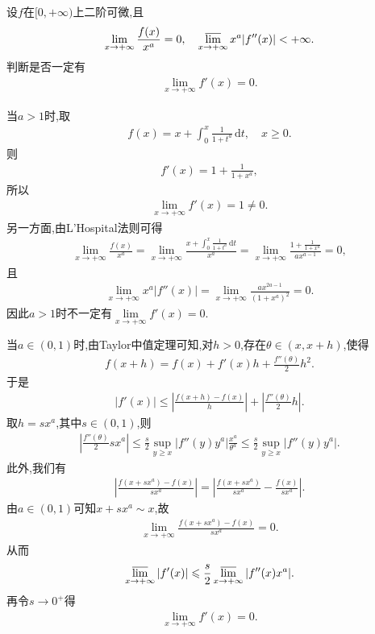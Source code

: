 \documentclass[../../main.tex]{subfiles}%
\begin{document}
\begin{example}
设$f$在$[0,+\infty)$上二阶可微,且
\begin{align*}
\lim\limits_{x\to+\infty}\frac{f(x)}{x^a}=0,\quad
\varlimsup\limits_{x\to+\infty}x^a|f''(x)|<+\infty.
\end{align*}
判断是否一定有
\begin{align*}
\lim\limits_{x\to+\infty}f'(x)=0.
\end{align*}
\end{example}
\begin{solution}

当$a>1$时,取
\begin{align*}
f(x)=x+\int_0^x\frac{1}{1+t^a}\,\mathrm{d}t,\quad x\geqslant 0.
\end{align*}
则
\begin{align*}
f'(x)=1+\frac{1}{1+x^a},
\end{align*}
所以
\begin{align*}
\lim\limits_{x\to+\infty}f'(x)=1\ne0.
\end{align*}
另一方面,由L'Hospital法则可得
\begin{align*}
\lim_{x\rightarrow +\infty} \frac{f(x)}{x^a}=\lim_{x\rightarrow +\infty} \frac{x+\int_0^x{\frac{1}{1+t^a}\,\mathrm{d}t}}{x^a}=\lim_{x\rightarrow +\infty} \frac{1+\frac{1}{1+x^a}}{ax^{a-1}}=0,
\end{align*}
且
\begin{align*}
\lim\limits_{x\to+\infty}x^a|f''(x)|
=\lim\limits_{x\to+\infty}\frac{ax^{2a-1}}{(1+x^a)^2}
=0.
\end{align*}
因此$a>1$时不一定有$\lim\limits_{x\to+\infty}f'(x)=0$.

当$a\in(0,1)$时,由Taylor中值定理可知,对$h>0$,存在$\theta\in(x,x+h)$,使得
\begin{align*}
f(x+h)=f(x)+f'(x)h+\frac{f''(\theta)}{2}h^2.
\end{align*}
于是
\begin{align*}
|f'(x)|
\leqslant
\left|\frac{f(x+h)-f(x)}{h}\right|
+\left|\frac{f''(\theta)}{2}h\right|.
\end{align*}
取$h=sx^a$,其中$s\in(0,1)$,则
\begin{align*}
\left|\frac{f''(\theta)}{2}sx^a\right|
\leqslant
\frac{s}{2}\sup_{y\geqslant x}|f''(y)y^a|
\frac{x^a}{\theta^a}
\leqslant
\frac{s}{2}\sup_{y\geqslant x}|f''(y)y^a|.
\end{align*}
此外,我们有
\begin{align*}
\left|\frac{f(x+sx^a)-f(x)}{sx^a}\right|
=
\left|
\frac{f(x+sx^a)}{s x^a}
-\frac{f(x)}{s x^a}
\right|.
\end{align*}
由$a\in(0,1)$可知$x+sx^a\sim x$,故
\begin{align*}
\lim\limits_{x\to+\infty}
\frac{f(x+sx^a)-f(x)}{sx^a}=0.
\end{align*}
从而
\begin{align*}
\varlimsup\limits_{x\to+\infty}|f'(x)|
\leqslant
\frac{s}{2}\varlimsup\limits_{x\to+\infty}|f''(x)x^a|.
\end{align*}
再令$s\to 0^+$得
\begin{align*}
\lim\limits_{x\to+\infty}f'(x)=0.
\end{align*}
\end{solution}
\end{document}
